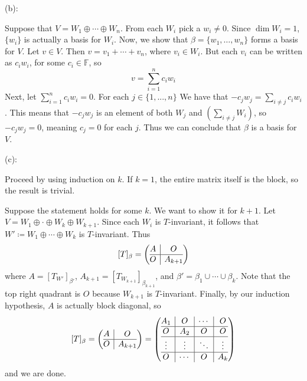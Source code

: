 \documentclass{eh-homework}
\begin{document}
\begin{question}{9}
    \bigskip

    (b):

    Suppose that \(V = W_1 \oplus \cdots \oplus W_n\). From each \(W_i\) pick a \(w_i \neq 0\). Since \(\dim W_i = 1\), \(\{ w_i \}\) is actually a basis for \(W_i\). Now, we show that \(\beta = \{ w_1, \ldots, w_{n} \}\) forms a basis for \(V\). Let \(v \in V\). Then \(v = v_1 + \cdots + v_n\), where \(v_i \in W_i\). But each \(v_i\) can be written as \(c_i w_i\), for some \(c_i \in \mathbb{F}\), so
    \[
        v = \sum_{i=1}^{n} c_i w_i
    \]
    Next, let \(\sum_{i=1}^{n} c_i w_i = 0\). For each \(j \in \{ 1, ..., n \}\) We have that \(-c_{j}  w_j = \sum_{i\neq j} c_i w_i\). This means that \(-c_j w_j\) is an element of both \(W_j\) and \(\left( \sum_{i\neq j} W_i \right)\), so \(-c_j w_j = 0\), meaning \(c_j = 0\) for each \(j\). Thus we can conclude that \(\beta\) is a basis for \(V\).

    \bigskip

    (c):

    Proceed by using induction on \(k\). If \(k = 1\), the entire matrix itself is the block, so the result is trivial.

    Suppose the statement holds for some \(k\). We want to show it for \(k+1\). Let \(V = W_1 \oplus \cdot \oplus W_k \oplus W_{k+1}\). Since each \(W_i\) is \(T\)-invariant, it follows that \(W' \coloneqq W_1 \oplus \cdots \oplus W_k\) is \(T\)-invariant. Thus
    \[
        [T]_\beta = \left( \begin{array}{@{}c|c@{}}
            A & O \\
            \hline
            O & A_{k+1} \\
        \end{array} \right)
    \]
    where \(A = [T_{W'}]_{\beta'}\), \(A_{k+1} = [T_{W_{k+1}}]_{\beta_{k+1}}\), and \(\beta ' = \beta _1 \cup \cdots \cup \beta _k\). Note that the top right quadrant is \(O\) because \(W_{k+1}\) is \(T\)-invariant. Finally, by our induction hypothesis, \(A\) is actually block diagonal, so
    \[
        [T]_\beta = \left( \begin{array}{@{}c|c@{}}
            A & O \\
            \hline
            O & A_{k+1} \\
        \end{array} \right) = \left( \begin{array}{@{}c|c|c|c@{}}
            A_1 & O & \cdots & O \\
            \hline
            O & A_2 & O & O \\
            \hline
            \vdots & \vdots & \ddots & \vdots \\
            \hline
            O & \cdots & O & A_k \\
        \end{array} \right)
    \]
    and we are done.
    \end{question}
\end{document}
